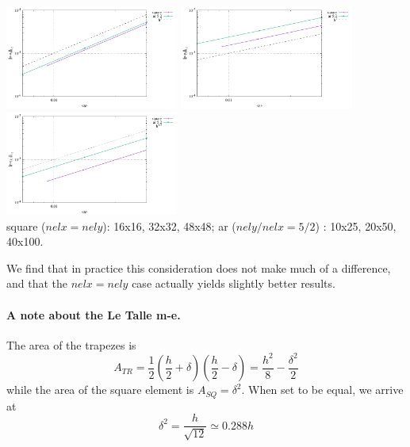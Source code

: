 \begin{center}
\includegraphics[width=5.7cm]{python_codes/fieldstone_78/results/exp01/stenberg_study/errors_u.pdf}
\includegraphics[width=5.7cm]{python_codes/fieldstone_78/results/exp01/stenberg_study/errors_p.pdf}
\includegraphics[width=5.7cm]{python_codes/fieldstone_78/results/exp01/stenberg_study/errors_q1.pdf}\\
{\captionfont square ($nelx=nely$): 16x16, 32x32, 48x48; 
ar ($nely/nelx=5/2$) : 10x25, 20x50, 40x100.}
\end{center}

We find that in practice this consideration does not make much of a difference,
and that the $nelx=nely$ case actually yields slightly better results.

\paragraph{A note about the Le Talle m-e.}

\begin{center}
\end{center}

The area of the trapezes is 
\[
A_{TR}=\frac12 (\frac{h}{2}+\delta) (\frac{h}{2}-\delta) = \frac{h^2}{8}- \frac{\delta^2}{2}
\]
while the area of the square element is $A_{SQ}=\delta^2$.
When set to be equal, we arrive at
\[
\delta^2 = \frac{h}{\sqrt{12}} \simeq 0.288 h
\]






